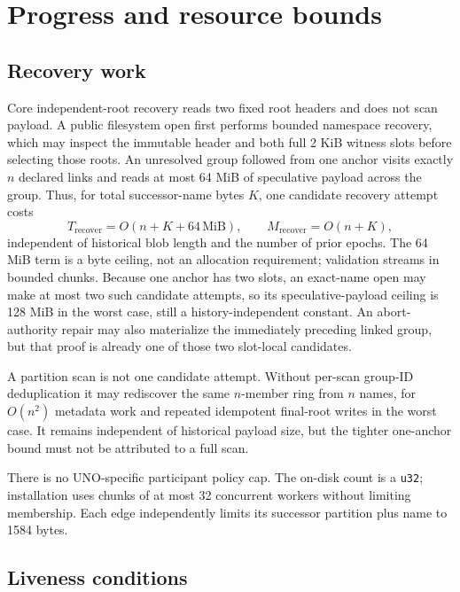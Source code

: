 \documentclass[10pt,twocolumn]{article}
\theoremstyle{remark}
\newcommand{\code}[1]{\texttt{#1}}
\begin{document}
\section{Progress and resource bounds}

\subsection{Recovery work}

Core independent-root recovery reads two fixed root headers and does not scan payload. A public
filesystem open first performs bounded namespace recovery, which may inspect the immutable header
and both full 2 KiB witness slots before selecting those roots. An unresolved group followed from
one anchor visits exactly $n$ declared links and reads at most 64 MiB of speculative payload across
the group. Thus, for total successor-name bytes $K$, one candidate recovery attempt costs
\[
  T_{\mathrm{recover}}=O(n+K+64\,\mathrm{MiB}),\qquad
  M_{\mathrm{recover}}=O(n+K),
\]
independent of historical blob length and the number of prior epochs. The 64 MiB term is a byte
ceiling, not an allocation requirement; validation streams in bounded chunks.
Because one anchor has two slots, an exact-name open may make at most two such candidate attempts,
so its speculative-payload ceiling is 128 MiB in the worst case, still a history-independent
constant. An abort-authority repair may also materialize the immediately preceding linked group, but that
proof is already one of those two slot-local candidates.

A partition scan is not one candidate attempt. Without per-scan group-ID deduplication it may
rediscover the same $n$-member ring from $n$ names, for $O(n^2)$ metadata work and repeated
idempotent final-root writes in the worst case. It remains independent of historical payload size,
but the tighter one-anchor bound must not be attributed to a full scan.

There is no UNO-specific participant policy cap. The on-disk count is a \code{u32}; installation
uses chunks of at most 32 concurrent workers without limiting membership. Each edge independently
limits its successor partition plus name to 1584 bytes.

\subsection{Liveness conditions}
\end{document}
